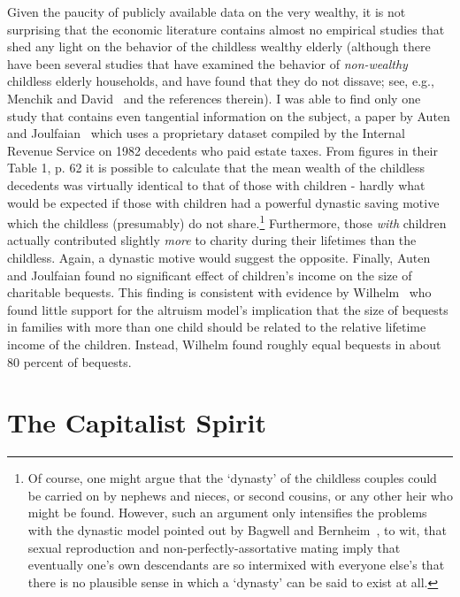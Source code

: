 \documentclass[titlepage,12pt]{article}
\begin{document}
Given the paucity of publicly available data on the very wealthy, it 
is not surprising that the economic literature contains almost no 
empirical studies that shed any light on the behavior of the childless 
wealthy elderly (although there have been several studies that have 
examined the behavior of {\it non-wealthy} childless elderly 
households, and have found that they do not dissave; see, e.g., 
Menchik and David~\cite{menchik&david:nodissav} and the references 
therein).  I was able to find only one study that contains even 
tangential information on the subject, a paper by Auten and 
Joulfaian~\cite{auten&joulfaian:charitable} which uses a proprietary 
dataset compiled by the Internal Revenue Service on 1982 decedents who 
paid estate taxes.  From figures in their Table 1, p.  62 it is 
possible to calculate that the mean wealth of the childless decedents 
was virtually identical to that of those with children - hardly what 
would be expected if those with children had a powerful dynastic 
saving motive which the childless (presumably) do not 
share.\footnote{Of course, one might argue that the `dynasty' of the 
childless couples could be carried on by nephews and nieces, or second 
cousins, or any other heir who might be found.  However, such an 
argument only intensifies the problems with the dynastic model pointed 
out by Bagwell and Bernheim~\cite{bagwell&bernheim:sex}, to wit, that 
sexual reproduction and non-perfectly-assortative mating imply that 
eventually one's own descendants are so intermixed with everyone 
else's that there is no plausible sense in which a `dynasty' can be 
said to exist at all.} Furthermore, those {\it with} children actually 
contributed slightly {\it more} to charity during their lifetimes than 
the childless.  Again, a dynastic motive would suggest the opposite.  
Finally, Auten and Joulfaian found no significant effect of children's 
income on the size of charitable bequests.  This finding is consistent 
with evidence by Wilhelm~\cite{wilhelm:bequest} who found little 
support for the altruism model's implication that the size of bequests 
in families with more than one child should be related to the relative 
lifetime income of the children.  Instead, Wilhelm found roughly equal 
bequests in about 80 percent of bequests.

\hypertarget{the-capitalist-spirit}{}
\section{The Capitalist Spirit}
\label{sec:CapitalistModel}
\end{document}
